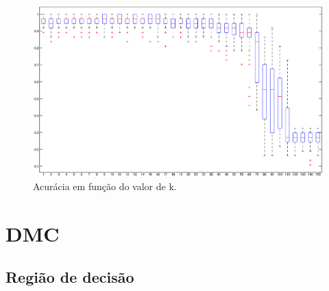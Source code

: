 \documentclass[
	article,			%
	11pt,				%
	oneside,			%
	a4paper,			%
	english,			%
	brazil,				%
	]{abntex2}
\begin{document}
\begin{figure}[!htb] \centering
	\includegraphics[width=\textwidth]{figuras/boxPlot_acuraciaVSK.eps}
	\caption{Acurácia em função do valor de k.}
	\label{fig:acuracia}
\end{figure}


\section{DMC}


\subsection{Região de decisão}
\end{document}
